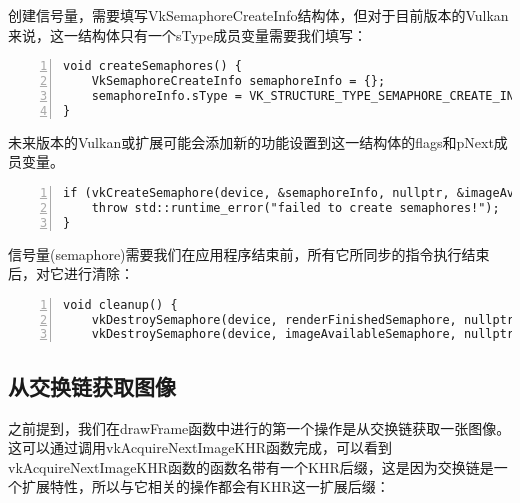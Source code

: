 \documentclass{ctexart}
\begin{document}
创建信号量，需要填写VkSemaphoreCreateInfo结构体，但对于目前版本的Vulkan来说，这一结构体只有一个sType成员变量需要我们填写：

\begin{lstlisting}[language={[ANSI]C},keywordstyle=\color{blue!70},commentstyle=\color{red!50!green!50!blue!50},frame=shadowbox, rulesepcolor=\color{red!20!green!20!blue!20},basicstyle=\small,numbers=left, numberstyle=\tiny,breaklines=true]
void createSemaphores() {
	VkSemaphoreCreateInfo semaphoreInfo = {};
	semaphoreInfo.sType = VK_STRUCTURE_TYPE_SEMAPHORE_CREATE_INFO;
}
\end{lstlisting}

未来版本的Vulkan或扩展可能会添加新的功能设置到这一结构体的flags和pNext成员变量。

\begin{lstlisting}[language={[ANSI]C},keywordstyle=\color{blue!70},commentstyle=\color{red!50!green!50!blue!50},frame=shadowbox, rulesepcolor=\color{red!20!green!20!blue!20},basicstyle=\small,numbers=left, numberstyle=\tiny,breaklines=true]
if (vkCreateSemaphore(device, &semaphoreInfo, nullptr, &imageAvailableSemaphore) != VK_SUCCESS || vkCreateSemaphore(device, &semaphoreInfo, nullptr, &renderFinishedSemaphore) != VK_SUCCESS) {
	throw std::runtime_error("failed to create semaphores!");
}
\end{lstlisting}

信号量(semaphore)需要我们在应用程序结束前，所有它所同步的指令执行结束后，对它进行清除：

\begin{lstlisting}[language={[ANSI]C},keywordstyle=\color{blue!70},commentstyle=\color{red!50!green!50!blue!50},frame=shadowbox, rulesepcolor=\color{red!20!green!20!blue!20},basicstyle=\small,numbers=left, numberstyle=\tiny,breaklines=true]
void cleanup() {
	vkDestroySemaphore(device, renderFinishedSemaphore, nullptr);
	vkDestroySemaphore(device, imageAvailableSemaphore, nullptr);
\end{lstlisting}

\subsection{从交换链获取图像}

之前提到，我们在drawFrame函数中进行的第一个操作是从交换链获取一张图像。这可以通过调用vkAcquireNextImageKHR函数完成，可以看到vkAcquireNextImageKHR函数的函数名带有一个KHR后缀，这是因为交换链是一个扩展特性，所以与它相关的操作都会有KHR这一扩展后缀：
\end{document}

